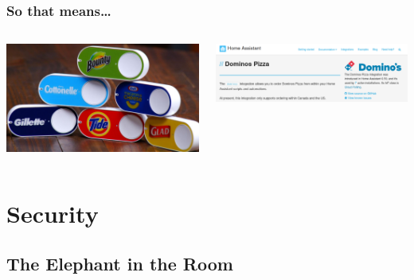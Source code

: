 \documentclass[aspectratio=169]{beamer}
\begin{document}
\begin{frame}[fragile]
  \frametitle{So that means\ldots}
  \begin{columns}[]
    \begin{column}[T]{0.45\paperwidth}
      \includegraphics[width=0.4\paperwidth,keepaspectratio]{images/amazon-button.jpg}
    \end{column}
    \begin{column}[T]{0.45\paperwidth}
      \includegraphics[width=0.45\paperwidth,keepaspectratio]{images/pizza.png}
    \end{column}
  \end{columns}
\end{frame}

\section{Security}
\frame{\sectionpage}
\subsection{The Elephant in the Room}
\frame{\subsectionpage}
\end{document}
